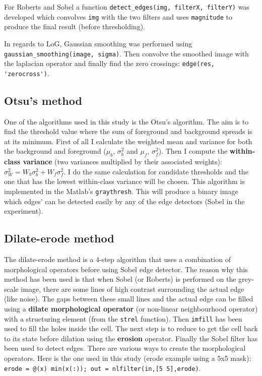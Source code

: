 \documentclass{article}
\begin{document}
	For Roberts and Sobel a function \verb|detect_edges(img, filterX, filterY)| was developed which convolves \verb|img| with the two filters and uses
	\verb|magnitude| to produce the final result (before thresholding).
	
	In regards to LoG, Gaussian smoothing was performed using \verb|gaussian_smoothing(image, sigma)|. Then convolve the smoothed image with the laplacian
	operator and finally find the zero crossings: \verb|edge(res, 'zerocross')|.
	
	\subsection*{Otsu's method}
	One of the algorithms used in this study is the Otsu's algorithm.
	The aim is to find the threshold value where the sum of foreground and background spreads is at its minimum. First of all I calculate the weighted mean and variance
	for both the background and foreground ($\mu_b$, $\sigma_b^2$ and
	$\mu_f$, $\sigma_f^2$). Then I compute the \textbf{within-class variance} (two variances multiplied by their associated weights): $\sigma_W^2 = W_b \sigma_b^2+W_f \sigma_f^2$. I do the same calculation for candidate thresholds and the one that has the lowest within-class variance will be chosen. This algorithm is implemented in the Matlab's
	\verb|graythresh|. This will produce a binary image which edges' can be detected
	easily by any of the edge detectors (Sobel in the experiment).
	
	\subsection*{Dilate-erode method}	
	
	The dilate-erode method is a 4-step algorithm that uses a combination of  morphological operators before using Sobel edge detector. The reason why this method
	has been used is that when Sobel (or Roberts) is performed on the grey-scale image, there are some lines of high contrast surrounding
	the actual edge (like noise). The gaps between these small lines and the actual edge
	can be filled using a \textbf{dilate morphological operator} (or non-linear neighbourhood
	operator) with a structuring element (from the \verb|strel| function). Then
	\verb|imfill| has been used to fill the holes inside the cell.
	The next step is to reduce to get the cell back to its state before dilation using
	the \textbf{erosion} operator. Finally the Sobel filter has been used to detect
	edges.
	There are various ways to create the  morphological operators. Here is the one
	used in this study (erode example using a 5x5 mask): \verb|erode = @(x) min(x(:)); out = nlfilter(in,[5 5],erode)|.
	
\end{document}
